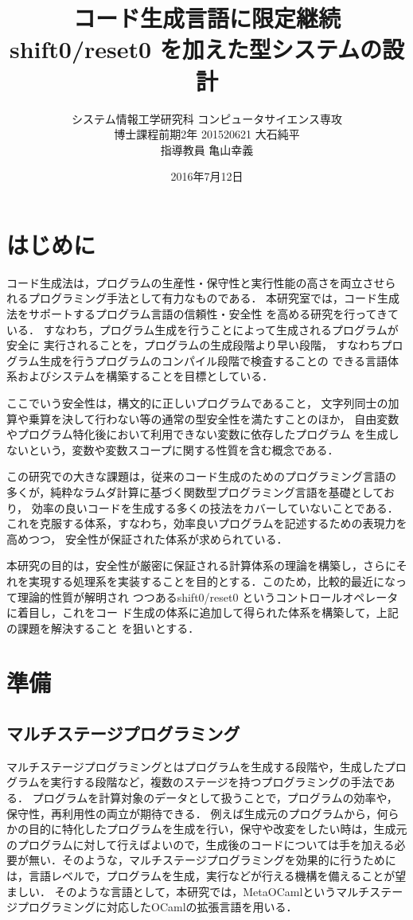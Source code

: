 \documentclass[10pt,a4j,xcolor=dvipsnames,twocolumn]{jarticle}
\title {\vspace{-2.0cm}\Large{コード生成言語に限定継続 shift0/reset0 を加えた型システムの設計}}
\date{2016年7月12日}
\author{システム情報工学研究科 コンピュータサイエンス専攻 \\
  博士課程前期2年 201520621 大石純平 \\
  指導教員 亀山幸義
}
\theoremstyle{definition}
\begin{document}
\maketitle
\section{はじめに}
コード生成法は，プログラムの生産性・保守性と実行性能の高さを両立させら
れるプログラミング手法として有力なものである．
本研究室では，コード生成法をサポートするプログラム言語の信頼性・安全性
を高める研究を行ってきている．
すなわち，プログラム生成を行うことによって生成されるプログラムが安全に
実行されることを，プログラムの生成段階より早い段階，
すなわちプログラム生成を行うプログラムのコンパイル段階で検査することの
できる言語体系およびシステムを構築することを目標としている．

ここでいう安全性は，構文的に正しいプログラムであること，
文字列同士の加算や乗算を決して行わない等の通常の型安全性を満たすことのほか，
自由変数やプログラム特化後において利用できない変数に依存したプログラム
を生成しないという，変数や変数スコープに関する性質を含む概念である．

この研究での大きな課題は，従来のコード生成のためのプログラミング言語の
多くが，純粋なラムダ計算に基づく関数型プログラミング言語を基礎としており，
効率の良いコードを生成する多くの技法をカバーしていないことである．
これを克服する体系，すなわち，効率良いプログラムを記述するための表現力を高めつつ，
安全性が保証された体系が求められている．

本研究の目的は，安全性が厳密に保証される計算体系の理論を構築し，さらにそれを実現する処理系を実装することを目的とする．このため，比較的最近になって理論的性質が解明され
つつあるshift0/reset0 というコントロールオペレータに着目し，これをコー
ド生成の体系に追加して得られた体系を構築して，上記の課題を解決すること
を狙いとする．

\section{準備}
\subsection{マルチステージプログラミング}
マルチステージプログラミングとはプログラムを生成する段階や，生成したプログラムを実行する段階など，複数のステージを持つプログラミングの手法である．
プログラムを計算対象のデータとして扱うことで，プログラムの効率や，保守性，再利用性の両立が期待できる．
例えば生成元のプログラムから，何らかの目的に特化したプログラムを生成を行い，保守や改変をしたい時は，生成元のプログラムに対して行えばよいので，生成後のコードについては手を加える必要が無い．そのような，マルチステージプログラミングを効果的に行うためには，言語レベルで，プログラムを生成，実行などが行える機構を備えることが望ましい．
そのような言語として，本研究では，MetaOCamlというマルチステージプログラミングに対応したOCamlの拡張言語を用いる．
\end{document}

